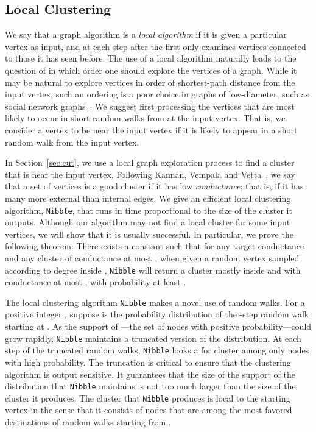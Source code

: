 \documentclass[11pt]{article}
\begin{document}
\subsection{Local Clustering}
We say that a graph algorithm is a \textit{local algorithm} if it is given
  a particular vertex as input,
  and at each step after the first only examines vertices connected to those
  it has seen before.
The use of a local algorithm naturally leads to the question of in which
  order one should explore the vertices of a graph.
While it may be natural to explore vertices in order of shortest-path
  distance from the input
  vertex, such an ordering is a poor choice in graphs of low-diameter,
  such as social network graphs~\cite{diameterSocialNetwork}.
We suggest first processing the vertices that are most likely
  to occur in short random walks from at the input vertex.
That is, we consider a vertex to be near the input vertex if it is likely
  to appear in a short random walk from the input vertex.

In Section~\ref{sec:cut}, we use a local graph exploration process
  to find a cluster that is near the input vertex.
Following Kannan, Vempala and Vetta~\cite{KannanVempalaVetta}, we say that
  a set of vertices is a good cluster if
  it has low \textit{conductance}; that is,
  if it has many more external than internal edges.
We give an efficient local clustering algorithm, \texttt{Nibble}, that
  runs in time proportional to the size of the cluster it outputs.
Although our algorithm may not find a local cluster
  for some input vertices,
  we will show that it is usually successful.
In particular, we prove the following theorem:
There exists a constant  such that for any
   target conductance  and any cluster  
   of conductance at most ,
   when given a random vertex   sampled according to degree
   inside ,
   \texttt{Nibble} will return a cluster  mostly inside   and with
  conductance at most ,
  with probability at least .

The local clustering algorithm \texttt{Nibble} makes a novel use of random walks.
For a positive integer , suppose  is
  the probability distribution of the -step
  random walk starting at .
As the support of ---the set of nodes with positive probability---could
  grow rapidly, \texttt{Nibble} maintains a truncated version
  of the distribution.
At each step of the truncated random walks,
  \texttt{Nibble} looks a for cluster among only nodes
  with high probability.
The truncation is critical to ensure that
    the clustering algorithm is output sensitive.
It guarantees that the size of the support of the distribution that
  \texttt{Nibble}
  maintains is not too much larger than the size of the cluster it produces.
The cluster that \texttt{Nibble}  produces is local to the starting
  vertex  in the sense that it consists of nodes that are among
  the most favored destinations of random walks starting from .
\end{document}
